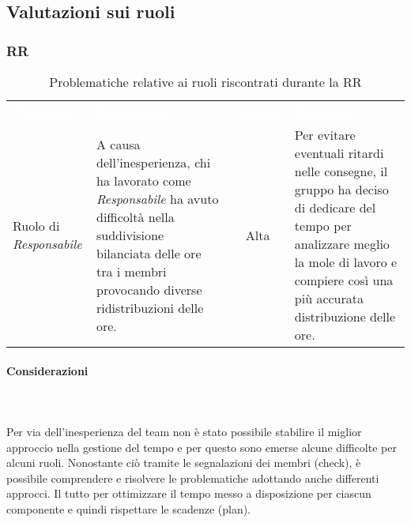 \subsection{Valutazioni sui ruoli}
\subsubsection{RR}
\begin{table}[H]
\caption{Problematiche relative ai ruoli riscontrati durante la RR}
\begin{center}
\begin{tabular}{ C{2.5cm} L{5cm} c L{5.5cm} }
\textcolor{white}{\textbf{Problema}} & \centerline{\textcolor{white}{\textbf{Descrizione}}} & \textcolor{white}{\textbf{Gravità}} & \centerline{\textcolor{white}{\textbf{Soluzione}}}\\
Ruolo di \textit{Responsabile} & A causa dell'inesperienza, chi ha lavorato come \textit{Responsabile} ha avuto difficoltà nella suddivisione bilanciata delle ore tra i membri provocando diverse ridistribuzioni delle ore. & Alta & Per evitare eventuali ritardi nelle consegne, il gruppo ha deciso di dedicare del tempo per analizzare meglio la mole di lavoro e compiere così una più accurata distribuzione delle ore. \\
\end{tabular}
\end{center}
\end{table}

\paragraph{Considerazioni}\mbox{} \\ \mbox{} \\
Per via dell'inesperienza del team non è stato possibile stabilire  il miglior approccio nella gestione del tempo e per questo sono emerse alcune difficolte per alcuni ruoli. Nonostante ciò tramite le segnalazioni dei membri (check), è possibile comprendere e risolvere le problematiche adottando anche differenti approcci. Il tutto per ottimizzare il tempo messo a disposizione per ciascun componente e quindi rispettare le scadenze (plan).

